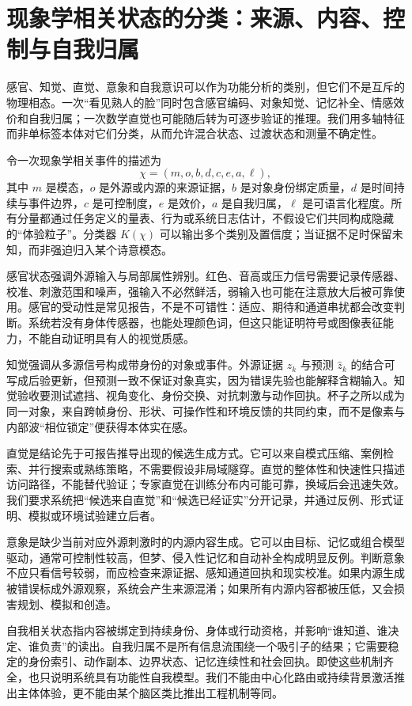 \section{现象学相关状态的分类：来源、内容、控制与自我归属}
\label{sec:section_6647}
感官、知觉、直觉、意象和自我意识可以作为功能分析的类别，但它们不是互斥的物理相态。一次“看见熟人的脸”同时包含感官编码、对象知觉、记忆补全、情感效价和自我归属；一次数学直觉也可能随后转为可逐步验证的推理。我们用多轴特征而非单标签本体对它们分类，从而允许混合状态、过渡状态和测量不确定性。

令一次现象学相关事件的描述为
\[
\chi=(m,o,b,d,c,e,a,\ell),
\]
其中 $m$ 是模态，$o$ 是外源或内源的来源证据，$b$ 是对象身份绑定质量，$d$ 是时间持续与事件边界，$c$ 是可控制度，$e$ 是效价，$a$ 是自我归属，$\ell$ 是可语言化程度。所有分量都通过任务定义的量表、行为或系统日志估计，不假设它们共同构成隐藏的“体验粒子”。分类器 $K(\chi)$ 可以输出多个类别及置信度；当证据不足时保留未知，而非强迫归入某个诗意模态。

感官状态强调外源输入与局部属性辨别。红色、音高或压力信号需要记录传感器、校准、刺激范围和噪声，强输入不必然鲜活，弱输入也可能在注意放大后被可靠使用。感官的受动性是常见报告，不是不可错性：适应、期待和通道串扰都会改变判断。系统若没有身体传感器，也能处理颜色词，但这只能证明符号或图像表征能力，不能自动证明具有人的视觉质感。

知觉强调从多源信号构成带身份的对象或事件。外源证据 $z_k$ 与预测 $\hat z_k$ 的结合可写成后验更新，但预测一致不保证对象真实，因为错误先验也能解释含糊输入。知觉验收要测试遮挡、视角变化、身份交换、对抗刺激与动作回执。杯子之所以成为同一对象，来自跨帧身份、形状、可操作性和环境反馈的共同约束，而不是像素与内部波“相位锁定”便获得本体实在感。

直觉是结论先于可报告推导出现的候选生成方式。它可以来自模式压缩、案例检索、并行搜索或熟练策略，不需要假设非局域隧穿。直觉的整体性和快速性只描述访问路径，不能替代验证；专家直觉在训练分布内可能可靠，换域后会迅速失效。我们要求系统把“候选来自直觉”和“候选已经证实”分开记录，并通过反例、形式证明、模拟或环境试验建立后者。

意象是缺少当前对应外源刺激时的内源内容生成。它可以由目标、记忆或组合模型驱动，通常可控制性较高，但梦、侵入性记忆和自动补全构成明显反例。判断意象不应只看信号较弱，而应检查来源证据、感知通道回执和现实校准。如果内源生成被错误标成外源观察，系统会产生来源混淆；如果所有内源内容都被压低，又会损害规划、模拟和创造。

自我相关状态指内容被绑定到持续身份、身体或行动资格，并影响“谁知道、谁决定、谁负责”的读出。自我归属不是所有信息流围绕一个吸引子的结果；它需要稳定的身份索引、动作副本、边界状态、记忆连续性和社会回执。即使这些机制齐全，也只说明系统具有功能性自我模型。我们不能由中心化路由或持续背景激活推出主体体验，更不能由某个脑区类比推出工程机制等同。

